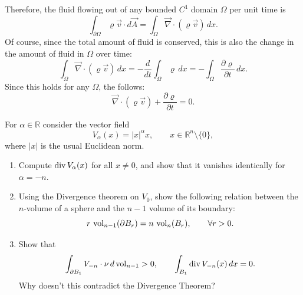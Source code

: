 Therefore, the fluid flowing out of any bounded $C^1$ domain $\Omega$ per unit time is
\[\int_{\partial\Omega} \varrho\vec v\cdot d\vec A = \int_\Omega \vec\nabla\cdot(\varrho
  \vec v)\,dx.\]
Of course, since the total amount of fluid is conserved, this is also the change in the
amount of fluid in $\Omega$ over time:
\[\int_\Omega \vec\nabla\cdot(\varrho\vec v)\,dx = -\frac{d}{dt}\int_\Omega \varrho\,dx
  = -\int_\Omega \frac{\partial\varrho}{\partial t}\,dx.\]
Since this holds for any $\Omega$, the 
 follows:
\[\vec\nabla\cdot(\varrho\vec v) + \frac{\partial\varrho}{\partial t} = 0.\]




\begin{exercise}
\label{ex:radial_vector_fields_flux}
For $\alpha\in\mathbb{R}$ consider the vector field
\[V_\alpha(x) = \lvert x\rvert^\alpha x, \qquad x\in\mathbb{R}^n\setminus\{0\},\]
where $\lvert x\rvert$ is the usual Euclidean norm.
\begin{enumerate}[label=\textbf{(\alph*)}]
  \item Compute $\operatorname{div} V_\alpha(x)$ for all $x\neq0$, and show that it vanishes identically
  for $\alpha=-n$.
  \item Using the Divergence theorem on $V_0$, show the following relation between the
  $n$-volume of a sphere and the $n-1$ volume of its boundary:
  \[r\,\operatorname{vol}_{n-1}(\partial B_r) = n\,\operatorname{vol}_n(B_r), \qquad \forall r>0.\]
  \item Show that
  \[\int_{\partial B_1} V_{-n}\cdot\nu\,d\operatorname{vol}_{n-1} > 0, \qquad \int_{B_1} \operatorname{div} V_{-n}(x)\,dx
    = 0.\]
  Why doesn't this contradict the Divergence Theorem?
\end{enumerate}
\end{exercise}

